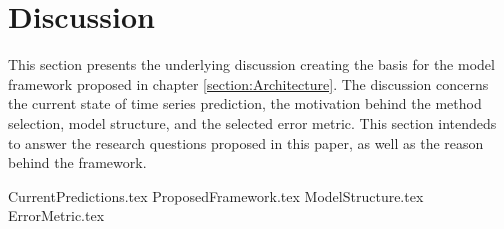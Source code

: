
\section{Discussion}
\label{section:Discussion:Discussion}



This section presents the underlying discussion creating the basis for the model framework proposed in chapter \ref{section:Architecture}.
The discussion concerns the current state of time series prediction, the motivation behind the method selection, model structure, and the selected error metric.
This section intendeds to answer the research questions proposed in this paper,
as well as the reason behind the framework.


{CurrentPredictions.tex}
{ProposedFramework.tex}
{ModelStructure.tex}
{ErrorMetric.tex}



\iffalse
  In the discussion it is important to include a discussion of not just the merits of the work conducted but also the limitations.
\fi
